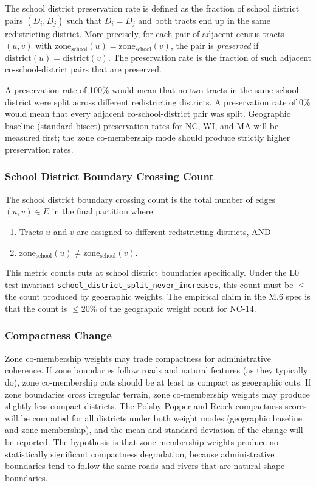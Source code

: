 The school district preservation rate is defined as the fraction of school district
pairs $(D_i, D_j)$ such that $D_i = D_j$ and both tracts end up in the same
redistricting district.
More precisely, for each pair of adjacent census tracts $(u, v)$ with
$\mathrm{zone}_{\text{school}}(u) = \mathrm{zone}_{\text{school}}(v)$, the pair
is \emph{preserved} if $\mathrm{district}(u) = \mathrm{district}(v)$.
The preservation rate is the fraction of such adjacent co-school-district pairs that
are preserved.

A preservation rate of 100\% would mean that no two tracts in the same school district
were split across different redistricting districts.
A preservation rate of 0\% would mean that every adjacent co-school-district pair
was split.
Geographic baseline (standard-bisect) preservation rates for NC, WI, and MA will be
measured first; the zone co-membership mode should produce strictly higher preservation
rates.

\subsubsection{School District Boundary Crossing Count}

The school district boundary crossing count is the total number of edges $(u, v) \in E$
in the final partition where:
\begin{enumerate}
  \item Tracts $u$ and $v$ are assigned to different redistricting districts, AND
  \item $\mathrm{zone}_{\text{school}}(u) \neq \mathrm{zone}_{\text{school}}(v)$.
\end{enumerate}
This metric counts cuts at school district boundaries specifically.
Under the L0 test invariant \texttt{school\_district\_split\_never\_increases},
this count must be $\leq$ the count produced by geographic weights.
The empirical claim in the M.6 spec is that the count is $\leq 20\%$ of the geographic
weight count for NC-14.

\subsubsection{Compactness Change}

Zone co-membership weights may trade compactness for administrative coherence.
If zone boundaries follow roads and natural features (as they typically do), zone
co-membership cuts should be at least as compact as geographic cuts.
If zone boundaries cross irregular terrain, zone co-membership weights may produce
slightly less compact districts.
The Polsby-Popper and Reock compactness scores will be computed for all districts
under both weight modes (geographic baseline and zone-membership), and the mean
and standard deviation of the change will be reported.
The hypothesis is that zone-membership weights produce no statistically significant
compactness degradation, because administrative boundaries tend to follow the same
roads and rivers that are natural shape boundaries.

